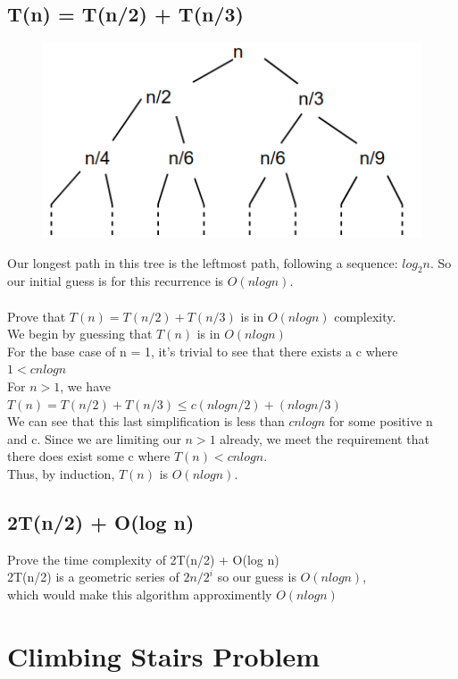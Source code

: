 \documentclass[10pt,letterpaper]{article}
\begin{document}
\subsection{T(n) = T(n/2) + T(n/3)}

\begin{figure}[h]
	\includegraphics[scale = .25]{recurtree1hw5.png}
\end{figure}

\noindent Our longest path in this tree is the leftmost path, following a sequence: $log_{2}n$. So our initial guess is for this recurrence is $O(nlogn)$.\\
\\
Prove that $T(n) = T(n/2) + T(n/3)$ is in $O(nlogn)$ complexity.\\
We begin by guessing that $T(n)$ is in $O(nlogn)$\\
For the base case of n = 1, it's trivial to see that there exists a c where $1 < cnlogn$ \\
For $ n > 1$, we have \\
$T(n) = T(n/2) + T(n/3) \leq c(nlogn/2) + (nlogn/3)$\\
We can see that this last simplification is less than $cnlogn$ for some positive n and c. Since we are limiting our $n > 1$ already, we meet the requirement that there does exist some c where $T(n) < c nlogn$. \\
Thus, by induction, $T(n)$ is $O(nlogn).$

\subsection{2T(n/2) + O(log n)}
Prove the time complexity of 2T(n/2) + O(log n)\\
2T(n/2) is a geometric series of $2n/2^{i}$ so our guess is $O(nlogn)$,\\
which would make this algorithm approximently $O(nlogn)$ 

\section{Climbing Stairs Problem}
\end{document}
